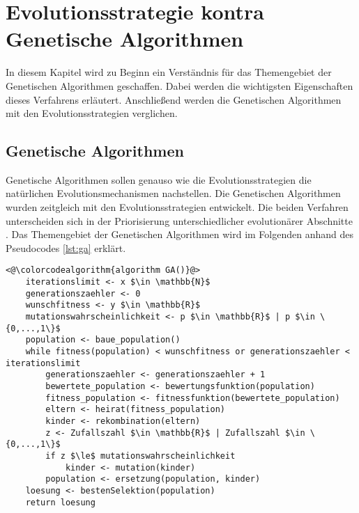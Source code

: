 \section{Evolutionsstrategie kontra Genetische Algorithmen}
In diesem Kapitel wird zu Beginn ein Verständnis für das Themengebiet der Genetischen Algorithmen geschaffen. Dabei werden die wichtigsten Eigenschaften dieses Verfahrens erläutert. Anschließend werden die Genetischen Algorithmen mit den Evolutionsstrategien verglichen.


\subsection{Genetische Algorithmen}
Genetische Algorithmen sollen genauso wie die Evolutionsstrategien die natürlichen Evolutionsmechanismen nachstellen.
Die Genetischen Algorithmen wurden zeitgleich mit den Evolutionsstrategien entwickelt. Die beiden Verfahren unterscheiden sich in der Priorisierung unterschiedlicher evolutionärer Abschnitte \cite[S. 185]{schoeneburg}.
Das Themengebiet der Genetischen Algorithmen wird im Folgenden anhand des Pseudocodes \ref{lst:ga} erklärt.

\begin{lstlisting}[caption={Grundlegender Genetischer Algorithmus}, firstnumber=1, captionpos=b, label=lst:ga]
<@\colorcodealgorithm{algorithm GA()}@>
	iterationslimit <- x $\in \mathbb{N}$
	generationszaehler <- 0
	wunschfitness <- y $\in \mathbb{R}$
	mutationswahrscheinlichkeit <- p $\in \mathbb{R}$ | p $\in \{0,...,1\}$
	population <- baue_population()
	while fitness(population) < wunschfitness or generationszaehler < iterationslimit
		generationszaehler <- generationszaehler + 1
		bewertete_population <- bewertungsfunktion(population)
		fitness_population <- fitnessfunktion(bewertete_population)
		eltern <- heirat(fitness_population)
		kinder <- rekombination(eltern)
		z <- Zufallszahl $\in \mathbb{R}$ | Zufallszahl $\in \{0,...,1\}$
		if z $\le$ mutationswahrscheinlichkeit 
			kinder <- mutation(kinder)
		population <- ersetzung(population, kinder)
	loesung <- bestenSelektion(population)
	return loesung
\end{lstlisting}

